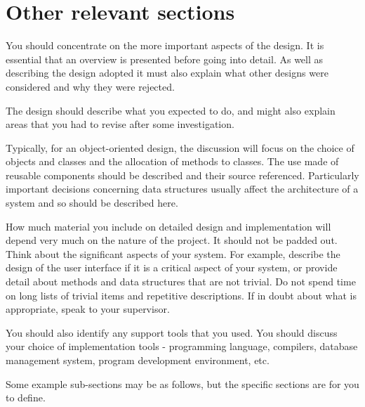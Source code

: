 \section{Other relevant sections}

You should concentrate on the more important aspects of the design. It is essential that an overview is presented before going into detail. As well as describing the design adopted it must also explain what other designs were considered and why they were rejected.

The design should describe what you expected to do, and might also explain areas that you had to revise after some investigation.

Typically, for an object-oriented design, the discussion will focus on the choice of objects and classes and the allocation of methods to classes. The use made of reusable components should be described and their source referenced. Particularly important decisions concerning data structures usually affect the architecture of a system and so should be described here.

How much material you include on detailed design and implementation will depend very much on the nature of the project. It should not be padded out. Think about the significant aspects of your system. For example, describe the design of the user interface if it is a critical aspect of your system, or provide detail about methods and data structures that are not trivial. Do not spend time on long lists of trivial items and repetitive descriptions. If in doubt about what is appropriate, speak to your supervisor.
 
You should also identify any support tools that you used. You should discuss your choice of implementation tools - programming language, compilers, database management system, program development environment, etc.

Some example sub-sections may be as follows, but the specific sections are for you to define. 
